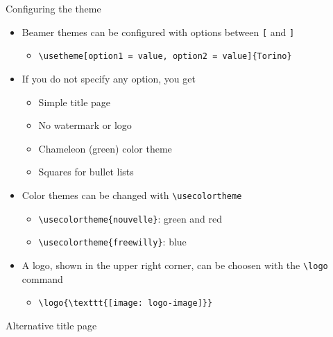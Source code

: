\begin{frame}[t,fragile]{Configuring the theme}
\begin{itemize}
\item Beamer themes can be configured with options between \verb![! and
      \verb!]!
  \begin{itemize}
  \item \verb!\usetheme[option1 = value, option2 = value]{Torino}!
  \end{itemize}
\item If you do not specify any option, you get
  \begin{itemize}
  \item Simple title page
  \item No watermark or logo
  \item Chameleon (green) color theme
  \item Squares for bullet lists
  \end{itemize}
\item Color themes can be changed with \verb!\usecolortheme!
  \begin{itemize}
  \item \verb!\usecolortheme{nouvelle}!: green and red
  \item \verb!\usecolortheme{freewilly}!: blue
  \end{itemize}
\item A logo, shown in the upper right corner, can be choosen with the
      \verb!\logo! command
  \begin{itemize}
  \item \verb!\logo{\texttt{[image: logo-image]}}!
  \end{itemize}
\end{itemize}
\end{frame}

\begin{frame}[t,fragile]{Alternative title page}
\end{frame}

